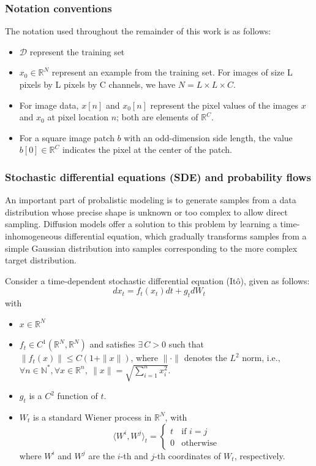 \documentclass[a4paper,10pt]{article}
\theoremstyle{definition} %
\theoremstyle{definition} %
\theoremstyle{definition} %
\theoremstyle{definition} %
\newcommand{\R}{\mathbb{R}}
\newcommand{\0}{\boldsymbol{0}}
\newcommand{\D}{\mathcal{D}}
\begin{document}
\subsubsection{Notation conventions}
The notation used throughout the remainder of this work is as follows:
\begin{itemize}
    \item[] $\D$ represent the training set
    \item[] $x_0\in\R^N$ represent an example from the training set. For images of size L pixels by L pixels by C channels, we have $N=L\times L \times C$.
    \item[] For image data, $x[n]$ and $x_0[n]$ represent the pixel values of the images $x$ and $x_0$ at pixel location $n$; both are elements of $\R^C$.
    \item[] For a square image patch $b$ with an odd-dimension side length, the value $b[0] \in \R^C$ indicates the pixel at the center of the patch.
\end{itemize}
\subsubsection{Stochastic differential equations (SDE) and probability flows}

An important part of probalistic modeling is to generate samples from a data distribution whose precise shape is unknown or too complex to allow direct sampling. Diffusion models offer a solution to this problem by learning a time-inhomogeneous differential equation, which gradually transforms samples from a simple Gaussian distribution into samples corresponding to the more complex target distribution.

Consider a time-dependent stochastic differential equation (Itô), given as follows:
    \begin{equation}\label{eq:SDE}
         dx_t = f_t(x_t)dt + g_tdW_t
    \end{equation}
    with 
    \begin{itemize}
        \item $x \in \mathbb{R}^N$
        \item $f_t \in C^1(\R^N,\R^N)$ and satisfies $\exists\, C > 0$ such that $\|f_t(x)\| \leq C(1 + \|x\|)$, where $\|\cdot\|$ denotes the $L^2$ norm, i.e., $\forall n \in \mathbb{N}^*, \forall x \in \mathbb{R}^n,\ \|x\| = \sqrt{\sum\limits_{i=1}^n x_i^2}$.
        \item $g_t$ is a $C^2$ function of $t$.
        \item $W_t$ is a standard Wiener process in $\mathbb{R}^N$, with
        \begin{equation*}
            \langle W^i, W^j \rangle_t =
            \begin{cases}
                t & \text{if } i = j \\
                0 & \text{otherwise}
            \end{cases}
        \end{equation*}
        where $W^i$ and $W^j$ are the $i$-th and $j$-th coordinates of $W_t$, respectively.
    \end{itemize}
    
\end{document}
